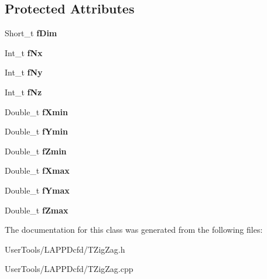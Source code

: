 \subsection*{Protected Attributes}
\begin{DoxyCompactItemize}
\item 
\hypertarget{classTZigZag_ad03af26416ed8b02193e3637563ea540}{Short\-\_\-t {\bfseries f\-Dim}}\label{classTZigZag_ad03af26416ed8b02193e3637563ea540}

\item 
\hypertarget{classTZigZag_a7401638043cfe92e7ebc042ca3c6fc92}{Int\-\_\-t {\bfseries f\-Nx}}\label{classTZigZag_a7401638043cfe92e7ebc042ca3c6fc92}

\item 
\hypertarget{classTZigZag_a99aadb7d7cac166797ec8be1002ff9ed}{Int\-\_\-t {\bfseries f\-Ny}}\label{classTZigZag_a99aadb7d7cac166797ec8be1002ff9ed}

\item 
\hypertarget{classTZigZag_a2391bf9bdee4fa705c1e1ff7fe164fa5}{Int\-\_\-t {\bfseries f\-Nz}}\label{classTZigZag_a2391bf9bdee4fa705c1e1ff7fe164fa5}

\item 
\hypertarget{classTZigZag_afb465288652c5ef5687eaec8fdfd66c7}{Double\-\_\-t {\bfseries f\-Xmin}}\label{classTZigZag_afb465288652c5ef5687eaec8fdfd66c7}

\item 
\hypertarget{classTZigZag_afb7ad8177f97744db5400b139bd58891}{Double\-\_\-t {\bfseries f\-Ymin}}\label{classTZigZag_afb7ad8177f97744db5400b139bd58891}

\item 
\hypertarget{classTZigZag_ad714cd33226f78923d31e4644abb4907}{Double\-\_\-t {\bfseries f\-Zmin}}\label{classTZigZag_ad714cd33226f78923d31e4644abb4907}

\item 
\hypertarget{classTZigZag_a4de41dd4ba2910dd539f5ae8c2c2f747}{Double\-\_\-t {\bfseries f\-Xmax}}\label{classTZigZag_a4de41dd4ba2910dd539f5ae8c2c2f747}

\item 
\hypertarget{classTZigZag_abdade06d6d715ea1fd15f16079fb1448}{Double\-\_\-t {\bfseries f\-Ymax}}\label{classTZigZag_abdade06d6d715ea1fd15f16079fb1448}

\item 
\hypertarget{classTZigZag_a5008b2801f2050403b3ada62d0522317}{Double\-\_\-t {\bfseries f\-Zmax}}\label{classTZigZag_a5008b2801f2050403b3ada62d0522317}

\end{DoxyCompactItemize}


The documentation for this class was generated from the following files\-:\begin{DoxyCompactItemize}
\item 
User\-Tools/\-L\-A\-P\-P\-Dcfd/T\-Zig\-Zag.\-h\item 
User\-Tools/\-L\-A\-P\-P\-Dcfd/T\-Zig\-Zag.\-cpp\end{DoxyCompactItemize}
